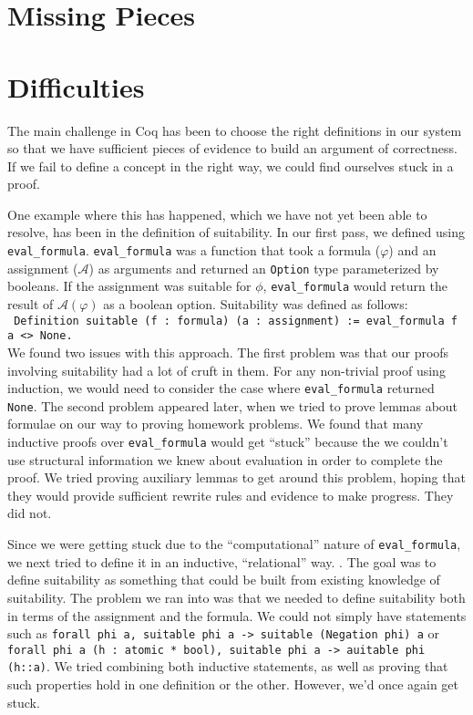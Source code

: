 \documentclass{article}
\begin{document}
\section{Missing Pieces}
\section{Difficulties}
The main challenge in Coq has been to choose the right definitions in our system so that we have sufficient pieces of evidence to build an argument of correctness. If we fail to define a concept in the right way, we could find ourselves stuck in a proof. 

One example where this has happened, which we have not yet been able to resolve, has been in the definition of suitability. In our first pass, we defined using \verb|eval_formula|. \verb|eval_formula| was a function that took a formula ($\varphi$) and an assignment ($\mathcal{A}$) as arguments and returned an \verb|Option| type parameterized by booleans. If the assignment was suitable for $\phi$, \verb|eval_formula| would return the result of $\mathcal{A}(\varphi)$ as a boolean option. Suitability was defined as follows:
\\
\verb| Definition suitable (f : formula) (a : assignment) := eval_formula f a <> None.|\\
We found two issues with this approach. The first problem was that our proofs involving suitability had a lot of cruft in them. For any non-trivial proof using induction, we would need to consider the case where \verb|eval_formula| returned \verb|None|. The second problem appeared later, when we tried to prove lemmas about formulae on our way to proving homework problems. We found that many inductive proofs over \verb|eval_formula| would get ``stuck'' because the we couldn't use structural information we knew about evaluation in order to complete the proof. We tried proving auxiliary lemmas to get around this problem, hoping that they would provide sufficient rewrite rules and evidence to make progress. They did not.

Since we were getting stuck due to the ``computational'' nature of \verb|eval_formula|, we next tried to define it in an inductive, ``relational'' way. . The goal was to define suitability as something that could be built from existing knowledge of suitability. The problem we ran into was that we needed to define suitability both in terms of the assignment and the formula. We could not simply have statements such as \verb|forall phi a, suitable phi a -> suitable (Negation phi) a| or \verb|forall phi a (h : atomic * bool), suitable phi a -> auitable phi (h::a)|. We tried combining both inductive statements, as well as proving that such properties hold in one definition or the other. However, we'd once again get stuck.
\end{document}
